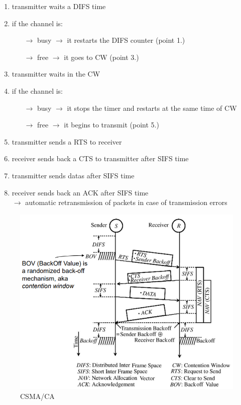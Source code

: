 \begin{itemize}
\begin{enumerate}
        \item transmitter waits a DIFS time
        \item if the channel is:
        \begin{itemize}
            \vspace{-0.1cm}\item[$\rightarrow$] busy $\rightarrow$ it restarts the DIFS counter (point 1.)
            \vspace{-0.1cm}\item[$\rightarrow$] free $\rightarrow$ it goes to CW (point 3.)
        \end{itemize}
        \item transmitter waits in the CW
        \item if the channel is:
        \begin{itemize}
            \vspace{-0.1cm}\item[$\rightarrow$] busy $\rightarrow$ it stops the timer and restarts at the same time of CW
            \vspace{-0.1cm}\item[$\rightarrow$] free $\rightarrow$ it begins to transmit (point 5.)
        \end{itemize}
        \item transmitter sends a RTS to receiver
        \item receiver sends back a CTS to transmitter after SIFS time
        \item transmitter sends datas after SIFS time
        \item receiver sends back an ACK after SIFS time\\
        $\rightarrow$ automatic retransmission of packets in case of transmission errors
    \end{enumerate}
\end{itemize}

\begin{figure}[!h] 
    \centering 
    \includegraphics[scale = 0.35]{images/data-sending-procedure.png} 
    \caption{CSMA/CA}
    \label{CSMA/CA}
\end{figure}

